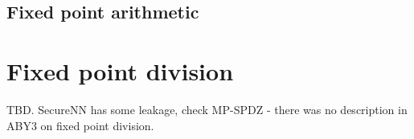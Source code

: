 \subsection{Fixed point arithmetic}
\label{subsec:fixed-point}

\section{Fixed point division}
TBD. SecureNN has some leakage, check MP-SPDZ - there was no description in
ABY3 on fixed point division.
